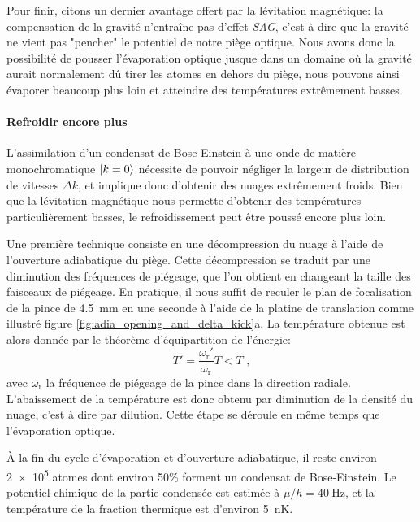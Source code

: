 Pour finir, citons un dernier avantage offert par la lévitation magnétique: la compensation de la gravité n'entraîne pas d'effet \emph{SAG}, c'est à dire que la gravité ne vient pas "pencher" le potentiel de notre piège optique. Nous avons donc la possibilité de pousser l'évaporation optique jusque dans un domaine où la gravité aurait normalement dû tirer les atomes en dehors du piège, nous pouvons ainsi évaporer beaucoup plus loin et atteindre des températures extrêmement basses.



\paragraph*{Refroidir encore plus}
L'assimilation d'un condensat de Bose-Einstein à une onde de matière monochromatique $\left| k=0 \right\rangle$ nécessite de pouvoir négliger la largeur de distribution de vitesses $\Delta k$, et implique donc d'obtenir des nuages extrêmement froids. Bien que la lévitation magnétique nous permette d'obtenir des températures particulièrement basses, le refroidissement peut être poussé encore plus loin. 

Une première technique consiste en une décompression du nuage à l'aide de l'ouverture adiabatique du piège. Cette décompression se traduit par une diminution des fréquences de piégeage, que l'on obtient en changeant la taille des faisceaux de piégeage. En pratique, il nous suffit de reculer le plan de focalisation de la pince de \SI{4.5}{\milli\metre} en une seconde à l'aide de la platine de translation comme illustré figure \ref{fig:adia_opening_and_delta_kick}a. La température obtenue est alors donnée par le théorème d'équipartition de l'énergie:
\begin{equation}
T'=\frac{\omega_{\mathrm{r}}'}{\omega_{\mathrm{r}}}T < T \text{ ,}
\end{equation}
avec $\omega_{\mathrm{r}}$ la fréquence de piégeage de la pince dans la direction radiale. L'abaissement de la température est donc obtenu par diminution de la densité du nuage, c'est à dire par dilution. Cette étape se déroule en même temps que l'évaporation optique.

À la fin du cycle d'évaporation et d'ouverture adiabatique, il reste environ \num{2e5} atomes dont environ 50\% forment un condensat de Bose-Einstein. Le potentiel chimique de la partie condensée est estimée à $\mu/h=\SI{40}{\hertz}$, et la température de la fraction thermique est d'environ \SI{5}{\nano\kelvin}. 

